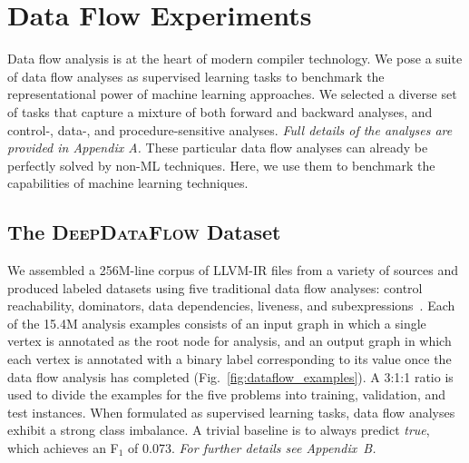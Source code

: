 \section{Data Flow Experiments}
\label{sec:dataflow_experiments}

Data flow analysis is at the heart of modern compiler technology. We pose a
suite of data flow analyses as supervised learning tasks to benchmark the
representational power of machine learning approaches. We selected a diverse set
of tasks that capture a mixture of both forward and backward analyses, and
control-, data-, and procedure-sensitive analyses. \emph{Full details of the
analyses are provided in Appendix A.} These particular data flow analyses can
already be perfectly solved by non-ML techniques. Here, we use them to benchmark
the capabilities of machine learning techniques.

\subsection{The \textsc{DeepDataFlow} Dataset}
\label{subsec:dataset}

We assembled a 256M-line corpus of LLVM-IR files from a variety of sources and
produced labeled datasets using five traditional data flow analyses: control
reachability, dominators, data dependencies, liveness, and
subexpressions~\cite{chris_cummins_2020_4247595}. Each of the 15.4M analysis
examples consists of an input graph in which a single vertex is annotated as the
root node for analysis, and an output graph in which each vertex is annotated
with a binary label corresponding to its value once the data flow analysis has
completed (Fig.~\ref{fig:dataflow_examples}). A 3:1:1 ratio is used to divide
the examples for the five problems into training, validation, and test
instances. When formulated as supervised learning tasks, data flow analyses
exhibit a strong class imbalance. A trivial baseline is to always predict
\emph{true}, which achieves an F$_1$ of 0.073.  \emph{For further details see
Appendix~B.}

